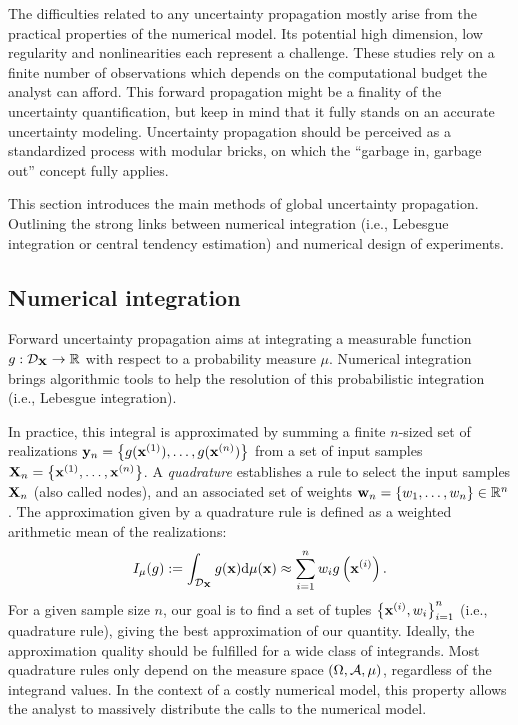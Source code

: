 The difficulties related to any uncertainty propagation mostly arise from the practical properties of the numerical model. 
Its potential high dimension, low regularity and nonlinearities each represent a challenge. 
These studies rely on a finite number of observations which depends on the computational budget the analyst can afford.   
This forward propagation might be a finality of the uncertainty quantification, but keep in mind that it fully stands on an accurate uncertainty modeling.
Uncertainty propagation should be perceived as a standardized process with modular bricks, on which the ``garbage in, garbage out'' concept fully applies.

This section introduces the main methods of global uncertainty propagation. 
Outlining the strong links between numerical integration (i.e., Lebesgue integration or central tendency estimation) and numerical design of experiments. 


\subsection{Numerical integration}

Forward uncertainty propagation aims at integrating a measurable function $g: \mathcal{D}_{{\bf X}} \rightarrow \mathbb{R}$ with respect to a probability measure $\mu$.
Numerical integration brings algorithmic tools to help the resolution of this probabilistic integration (i.e., Lebesgue integration). 

In practice, this integral is approximated by summing a finite $n$-sized set of realizations ${\bf y}_n = \left\{g({\bf x}^{(1)}), \dots, g({\bf x}^{(n)})\right\}$ from a set of input samples ${\bf X}_n = \left\{{\bf x}^{(1)}, \dots, {\bf x}^{(n)}\right\}$. 
A \textit{quadrature} establishes a rule to select the input samples ${\bf X}_n$ (also called nodes), and an associated set of weights ${\bf w}_n = \{w_1, \dots, w_n\} \in \mathbb{R}^n$. 
The approximation given by a quadrature rule is defined as a weighted arithmetic mean of the realizations:
\begin{equation}
    I_{\mu}(g) := \int_{\mathcal{D}_{\bf X}} g({\bf x}) \mathrm{d}\mu({\bf x}) \approx \sum_{i=1}^n w_i g\left({\bf x}^{(i)}\right).
    \label{eq:quadrature_rule}
\end{equation}
For a given sample size $n$, our goal is to find a set of tuples $\left\{{\bf x}^{(i)}, w_i \right\}_{i=1}^n$ (i.e., quadrature rule), giving the best approximation of our quantity. 
Ideally, the approximation quality should be fulfilled for a wide class of integrands. 
Most quadrature rules only depend on the measure space $(\Omega, \mathcal{A}, \mu)$, regardless of the integrand values.
In the context of a costly numerical model, this property allows the analyst to massively distribute the calls to the numerical model. 


